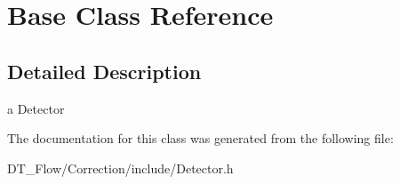 \hypertarget{classBase}{}\section{Base Class Reference}
\label{classBase}


\subsection{Detailed Description}
a Detector 

The documentation for this class was generated from the following file\+:\begin{DoxyCompactItemize}
\item 
D\+T\+\_\+\+Flow/\+Correction/include/Detector.\+h\end{DoxyCompactItemize}
